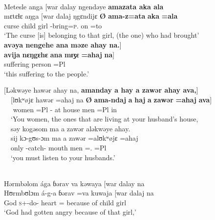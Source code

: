 \ea \label{ex:5:99}\\
Metesle  anga [war  dalay  ngendəye  \textbf{amazata  aka  ala}  \\
\gll mɛtɛɬɛ aŋga [war dalaj ŋgɛndijɛ \textbf{Ø} \textbf{ama-z=ata}   \textbf{aka}  \textbf{=ala} \\
curse  {\POSS}  child  girl  {\DEM}  { }    {\DEP}-bring=\textsc{p}.{\IO} on  =to\\
\glt ‘The curse [is] belonging to that girl, (the one) who had brought’\\

\clearpage
\medskip
\textbf{avəya  nengehe  ana  məze  ahay  na.}]\\
\gll \textbf{avija} \textbf{nɛŋgɛhɛ} \textbf{ana} \textbf{mɪʒɛ} \textbf{=ahaj} \textbf{na}]\\
suffering    {\DEM}    {\DAT}    person    =Pl          {\PSP}\\
\glt ‘this suffering to the people.’
\z

\ea \label{ex:5:100}
{}[Ləkwəye  hawər  ahay  na, \textbf{amanday  a  hay  a  zawər  ahay  ava,}] \\
\gll  \ \ {}[lʊkʷøjɛ  hawər  =ahaj   na  \textbf{Ø}    \textbf{ama-ndaj} \textbf{a} \textbf{haj} \textbf{a} \textbf{zawər} \textbf{=ahaj} \textbf{ava}]\\
     \ \ {\twoP}    women  =Pl  {\PSP}    { }      {\DEP}-{\PROG}  at  house  {\GEN}  men  =Pl  in\\
\glt  \ \ ‘You women, the ones that are living at your husband’s house,\\
\medskip
 \ \ səy  kogəsom  ma  a  zawər  aləkwəye  ahay.\\
\gll \ \ sij kɔ-gʊs-ɔm ma a zawər =alʊkʷøjɛ =ahaj\\
\ \ only    -catch-{\twoP}  mouth  {\GEN}  men  ={\twoP}.{\POSS}  =Pl  \\
\glt \ \ ‘you must listen to your husbands.’
\z

\ea \label{ex:5:101}\\
Hərmbəlom  ága  ɓərav  va  kəwaya  [war  dalay  na  \\
\gll  Hʊrmbʊlɔm  á-g-a         ɓərav   =va  kuwaja     [war      dalaj   na  \\
      God \textsc{s}+{\IFV}-do-{\CL}  heart   ={\PRF}  {because of}   child   girl      {\PSP}\\
\glt ‘God had gotten angry because of that girl,’\\

